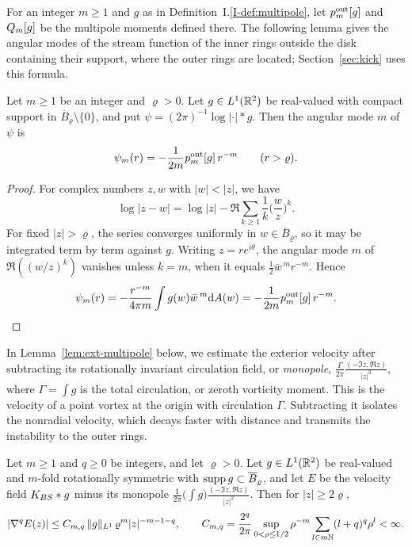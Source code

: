 For an integer $m\ge1$ and $g$ as in Definition~I.\ref{I-def:multipole}, let
$p^{\mathrm{out}}_m[g]$ and $Q_m[g]$ be the multipole moments defined there.
The following lemma gives the angular modes of the stream function of the
inner rings outside the disk containing their support, where the outer rings
are located; Section~\ref{sec:kick} uses this formula.

\begin{lemma}
\label{lem:exterior-mode}
Let $m\ge1$ be an integer and $\varrho>0$. Let $g\in L^1(\mathbb{R}^2)$ be
real-valued with compact support in $\overline B_{\varrho}\setminus\{0\}$,
and put $\psi=(2\pi)^{-1}\log|\cdot|\ast g$. Then the angular mode $m$ of
$\psi$ is
\[
\psi_m(r)=-\frac1{2m}p^{\mathrm{out}}_m[g]\,r^{-m}\qquad(r>\varrho).
\]
\end{lemma}

\begin{proof}
For complex numbers $z,w$ with $|w|<|z|$, we have
\[
\log|z-w|=\log|z|-\Re\sum_{k\ge1}\frac1k\Big(\frac wz\Big)^k
.
\]
For fixed $|z|>\varrho$, the series converges uniformly in
$w\in\overline B_\varrho$, so it may be integrated term by term against $g$.
Writing $z=re^{i\theta}$, the angular mode $m$ of
$\Re((w/z)^k)$ vanishes unless $k=m$, when it equals
$\tfrac12\bar w^{\,m}r^{-m}$. Hence
\[
\psi_m(r)=-\frac{r^{-m}}{4\pi m}\int g(w)\bar w^{\,m}\dd A(w)
=-\frac1{2m}p^{\mathrm{out}}_m[g]\,r^{-m}.
\qedhere
\]
\end{proof}

In Lemma~\ref{lem:ext-multipole} below, we estimate the exterior velocity after
subtracting its rotationally invariant circulation field, or \emph{monopole},
$\frac{\Gamma}{2\pi}\frac{(-\Im z,\Re z)}{|z|^2}$, where
$\Gamma=\int g$ is the total circulation, or zeroth vorticity moment.
This is the velocity of a point vortex at the origin with circulation
$\Gamma$. Subtracting it isolates the nonradial velocity, which decays faster
with distance and transmits the instability to the outer rings.

\begin{lemma}
\label{lem:ext-multipole}
Let $m\ge1$ and $q\ge0$ be integers, and let $\varrho>0$. Let $g\in L^1(\mathbb{R}^2)$ be
real-valued and $m$-fold rotationally symmetric with $\operatorname{supp} g\subset\overline{B}_\varrho$, and let $E$ be the
velocity field $K_{BS}\ast g$ minus its monopole
$\frac{1}{2\pi}\big(\int g\big)\frac{(-\Im z,\Re z)}{|z|^2}$. Then for $|z|\ge2\varrho$,
\[
|\nabla^qE(z)|\le C_{m,q}\,\|g\|_{L^1}\,\varrho^m|z|^{-m-1-q},\qquad
C_{m,q}=\frac{2^q}{2\pi}\sup_{0<\rho\le1/2}\rho^{-m}\sum_{l\in m\mathbb{N}}(l+q)^q\rho^{l}<\infty .
\]
\end{lemma}

